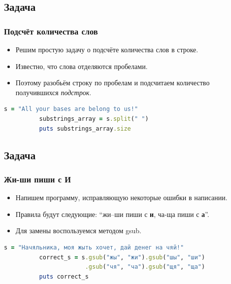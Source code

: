 \documentclass[compress,red]{beamer}
\begin{document}
\subsection{Задача}
\begin{frame}[fragile]
  \frametitle{Подсчёт количества слов}
		\begin{itemize}
  		\item Решим простую задачу о подсчёте количества слов в строке.
  		\item Известно, что слова отделяются пробелами.
  		\item Поэтому разобьём строку по пробелам и подсчитаем количество получившихся \emph{подстрок}.
  	\end{itemize}
  	\scriptsize{
  		\begin{lstlisting}[language=ruby,basicstyle=\footnotesize,label=ruby4,caption=Слова]
  		  s = "All your bases are belong to us!"
  		  substrings_array = s.split(" ")
  		  puts substrings_array.size
      \end{lstlisting}}
\end{frame}

\subsection{Задача}
\begin{frame}[fragile]
  \frametitle{Жи-ши пиши с И}
		\begin{itemize}
  		\item Напишем программу, исправляющую некоторые ошибки в написании.
  		\item Правила будут следующие: ``жи--ши пиши с \textbf{и}, ча-ща пиши с \textbf{а}''.
  		\item Для замены воспользуемся методом gsub.
  	\end{itemize}
  	\scriptsize{
  		\begin{lstlisting}[language=ruby,basicstyle=\footnotesize,label=ruby5,caption=Правила]
  		  s = "Начяльника, моя жыть хочет, дай денег на чяй!"
  		  correct_s = s.gsub("жы", "жи").gsub("шы", "ши")
  		               .gsub("чя", "ча").gsub("щя", "ща")
  		  puts correct_s
      \end{lstlisting}}
\end{frame}
\end{document}
